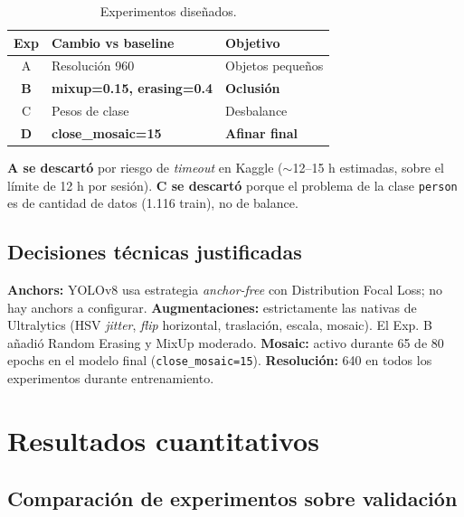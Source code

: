 \documentclass[conference]{IEEEtran}
\begin{document}
\begin{table}[h]
\centering
\caption{Experimentos diseñados.}
\label{tab:exp}
\renewcommand{\arraystretch}{1.15}
\begin{tabular}{c l p{2.5cm}}
\toprule
\textbf{Exp} & \textbf{Cambio vs baseline} & \textbf{Objetivo} \\
\midrule
A & Resolución 960 & Objetos pequeños \\
\textbf{B} & \textbf{mixup=0.15, erasing=0.4} & \textbf{Oclusión} \\
C & Pesos de clase & Desbalance \\
\textbf{D} & \textbf{close\_mosaic=15} & \textbf{Afinar final} \\
\bottomrule
\end{tabular}
\end{table}

\textbf{A se descartó} por riesgo de \emph{timeout} en Kaggle
($\sim$12--15 h estimadas, sobre el límite de 12 h por sesión).
\textbf{C se descartó} porque el problema de la clase \texttt{person}
es de cantidad de datos (1.116 train), no de balance.

\subsection{Decisiones técnicas justificadas}

\textbf{Anchors:} YOLOv8 usa estrategia \emph{anchor-free} con
Distribution Focal Loss; no hay anchors a configurar.
\textbf{Augmentaciones:} estrictamente las nativas de Ultralytics
(HSV \emph{jitter}, \emph{flip} horizontal, traslación, escala,
mosaic). El Exp. B añadió Random Erasing y MixUp moderado.
\textbf{Mosaic:} activo durante 65 de 80 epochs en el modelo final
(\texttt{close\_mosaic=15}).
\textbf{Resolución:} 640 en todos los experimentos durante entrenamiento.

\section{Resultados cuantitativos}

\subsection{Comparación de experimentos sobre validación}
\end{document}
